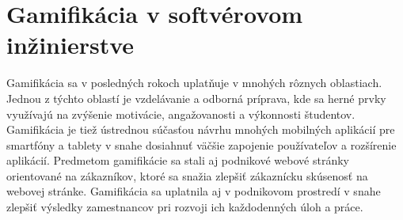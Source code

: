 \documentclass[14pt,twoside,a4paper]{article}
\begin{document}
\section{Gamifikácia v softvérovom inžinierstve}
Gamifikácia sa v posledných rokoch uplatňuje v mnohých rôznych oblastiach. 
Jednou z týchto oblastí je vzdelávanie a odborná príprava, 
kde sa herné prvky využívajú na zvýšenie motivácie, 
angažovanosti a výkonnosti študentov. 
Gamifikácia je tiež ústrednou súčasťou návrhu mnohých 
mobilných aplikácií pre smartfóny a tablety v snahe 
dosiahnuť väčšie zapojenie používateľov a rozšírenie aplikácií. 
Predmetom gamifikácie sa stali aj podnikové webové 
stránky orientované na zákazníkov, 
ktoré sa snažia zlepšiť zákaznícku skúsenosť na webovej 
stránke. Gamifikácia sa uplatnila aj v podnikovom 
prostredí v snahe zlepšiť výsledky zamestnancov pri 
rozvoji ich každodenných úloh a práce\cite{gamifsoft}.
\end{document}
